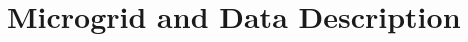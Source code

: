 \documentclass[conference]{IEEEtran}
\begin{document}
%
%
%
%
%
%
%
%


\section{Microgrid and Data Description}
\end{document}
